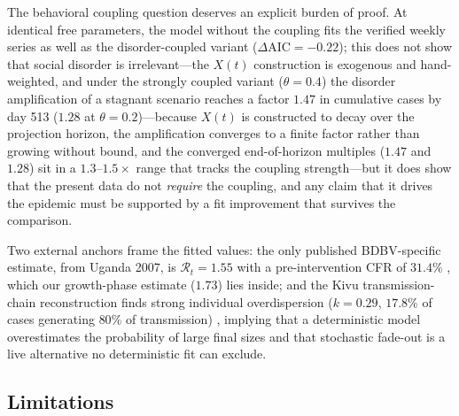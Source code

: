 \documentclass[preprint,12pt,numbers]{elsarticle}
\newcommand{\Reff}{\mathcal{R}}
\begin{document}
The behavioral coupling question deserves an explicit burden of proof.
At identical free parameters, the model without the coupling fits the
verified weekly series as well as the disorder-coupled variant
($\Delta\mathrm{AIC}=-0.22$); this does not show that social disorder is
irrelevant---the $X(t)$ construction is exogenous and hand-weighted, and
under the strongly coupled variant ($\theta=0.4$) the disorder
amplification of a stagnant scenario reaches a factor $1.47$ in
cumulative cases by day 513 ($1.28$ at $\theta=0.2$)---because $X(t)$ is
constructed to decay over the projection horizon, the amplification
converges to a finite factor rather than growing without bound, and the
converged end-of-horizon multiples ($1.47$ and $1.28$) sit in a
$1.3$--$1.5\times$ range that tracks the coupling strength---but it does show
that the present data do
not \emph{require} the coupling, and any claim that it drives the
epidemic must be supported by a fit improvement that survives the
comparison.

Two external anchors frame the fitted values: the only published
BDBV-specific estimate, from Uganda 2007, is $\Reff_t=1.55$ with a
pre-intervention CFR of $31.4\%$
\cite{DePadua2026}, which our growth-phase estimate ($1.73$) lies
inside; and the Kivu transmission-chain reconstruction finds strong
individual overdispersion ($k=0.29$, $17.8\%$ of cases generating
$80\%$ of transmission) \cite{Soubrier2026}, implying that a
deterministic model overestimates the probability of large final sizes
and that stochastic fade-out is a live alternative no deterministic fit
can exclude.
\subsection{Limitations}\label{sec:limits}
\end{document}
